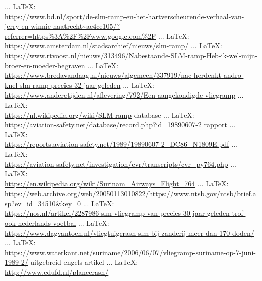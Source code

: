 \begin{thebibliography}{99}
{{{	 ... \LaTeX:\\ \url{https://www.bd.nl/sport/de-slm-ramp-en-het-hartverscheurende-verhaal-van-jerry-en-winnie-haatrecht~ae4ce105/?referrer=https%3A%2F%2Fwww.google.com%2F}
	 ... \LaTeX:\\ \url{https://www.amsterdam.nl/stadsarchief/nieuws/slm-ramp/}
	 ... \LaTeX:\\ \url{https://www.rtvoost.nl/nieuws/313496/Nabestaande-SLM-ramp-Heb-ik-wel-mijn-broer-en-moeder-begraven}
	 ... \LaTeX:\\ \url{https://www.bredavandaag.nl/nieuws/algemeen/337919/nac-herdenkt-andro-knel-slm-ramp-precies-32-jaar-geleden}
	 ... \LaTeX:\\ \url{https://www.anderetijden.nl/aflevering/792/Een-aangekondigde-vliegramp}
	 ... \LaTeX:\\ \url{https://nl.wikipedia.org/wiki/SLM-ramp}
	database
	 ... \LaTeX:\\ \url{https://aviation-safety.net/database/record.php?id=19890607-2}
	rapport
	 ... \LaTeX:\\ \url{https://reports.aviation-safety.net/1989/19890607-2_DC86_N1809E.pdf}
	 ... \LaTeX:\\ \url{https://aviation-safety.net/investigation/cvr/transcripts/cvr_py764.php}
	 ... \LaTeX:\\ \url{https://en.wikipedia.org/wiki/Surinam_Airways_Flight_764}
	 ... \LaTeX:\\ \url{https://web.archive.org/web/20050113010822/https://www.ntsb.gov/ntsb/brief.asp?ev_id=34510&key=0}
	 ... \LaTeX:\\ \url{https://nos.nl/artikel/2287986-slm-vliegramp-van-precies-30-jaar-geleden-trof-ook-nederlands-voetbal}
	 ... \LaTeX:\\ \url{https://www.dagvantoen.nl/vliegtuigcrash-slm-bij-zanderij-meer-dan-170-doden/}
	 ... \LaTeX:\\ \url{https://www.waterkant.net/suriname/2006/06/07/vliegramp-suriname-op-7-juni-1989-2/}
	uitgebreid engels artikel
	 ... \LaTeX:\\ \url{http://www.edufd.nl/planecrash/}
}}}
\end{thebibliography}

